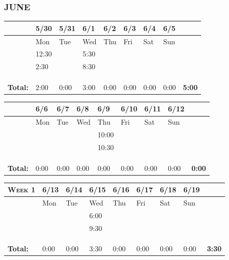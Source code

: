 \documentclass{article}
\begin{document}
\subsubsection*{JUNE}

\begin{tabular}{ |m{1cm}||m{1cm}|m{1cm}|m{1cm}|m{1cm}|m{1cm}|m{1cm}|m{1cm}||m{1cm}|} 
\hline
 & 5/30 & 5/31 & 6/1 & 6/2 & 6/3 & 6/4 & 6/5 & \\ 
\hline
\rowcolor{lightgray} 
\cellcolor{white} & Mon & Tue & Wed & Thu & Fri & Sat & Sun & \cellcolor{white}\\ 
\hline
\hline
 & 12:30 & & 5:30 & & & & & \\ 
\hline
 & 2:30 & & 8:30 & & & & & \\ 
\hline
 & & & & & & & & \\ 
\hline
 & & & & & & & & \\ 
\hline
 & & & & & & & & \\ 
\hline
\textbf{Total:} & 2:00 & 0:00 & 3:00 & 0:00 & 0:00 & 0:00 & 0:00 & \textbf{5:00} \\
\hline
\end{tabular}

\vspace{0.2in}

\begin{tabular}{ |m{1cm}||m{1cm}|m{1cm}|m{1cm}|m{1cm}|m{1cm}|m{1cm}|m{1cm}||m{1cm}|} 
\hline
 & 6/6 & 6/7 & 6/8 & 6/9 & 6/10 & 6/11 & 6/12 & \\ 
\hline
\rowcolor{lightgray} 
\cellcolor{white} & Mon & Tue & Wed & Thu & Fri & Sat & Sun & \cellcolor{white}\\ 
\hline
\hline
 & & & &10:00 & & & & \\ 
\hline
 & & & &10:30 & & & & \\ 
\hline
 & & & & & & & & \\ 
\hline
 & & & & & & & & \\ 
\hline
 & & & & & & & & \\ 
\hline
\textbf{Total:} & 0:00 & 0:00 & 0:00 & 0:00 & 0:00 & 0:00 & 0:00 & \textbf{0:00} \\
\hline
\end{tabular}

\vspace{0.2in}

\begin{tabular}{ |m{1cm}||m{1cm}|m{1cm}|m{1cm}|m{1cm}|m{1cm}|m{1cm}|m{1cm}||m{1cm}|} 
\hline
\textsc{Week 1} & 6/13 & 6/14 & 6/15 & 6/16 & 6/17 & 6/18 & 6/19 & \\ 
\hline
\rowcolor{lightgray} 
\cellcolor{white} & Mon & Tue & Wed & Thu & Fri & Sat & Sun & \cellcolor{white}\\ 
\hline
\hline
 & & & 6:00 & & & & & \\ 
\hline
 & & & 9:30 & & & & & \\ 
\hline
 & & & & & & & & \\ 
\hline
 & & & & & & & & \\ 
\hline
 & & & & & & & & \\ 
\hline
\textbf{Total:} & 0:00 & 0:00 & 3:30 & 0:00 & 0:00 & 0:00 & 0:00 & \textbf{3:30} \\
\hline
\end{tabular}
\end{document}
